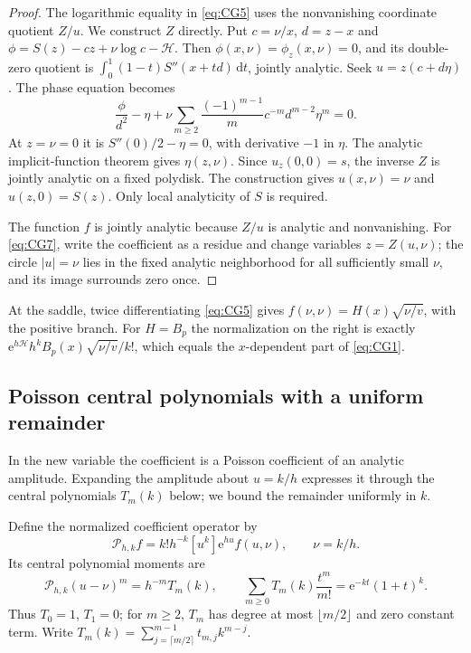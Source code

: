 \begin{proof}
The logarithmic equality in \eqref{eq:CG5} uses the nonvanishing
coordinate quotient \(Z/u\). We construct $Z$ directly. Put $c=\nu/x$, $d=z-x$ and
$\phi=S(z)-cz+\nu\log c-\mathcal H$.
Then $\phi(x,\nu)=\phi_z(x,\nu)=0$, and its double-zero quotient is
$\int_0^1(1-t)S''(x+td)\,\mathrm{d}t$, jointly analytic.
Seek $u=z(c+d\eta)$. The phase equation becomes
\begin{equation}
 \frac{\phi}{d^2}-\eta+
 \nu\sum_{m\ge2}\frac{(-1)^{m-1}}m c^{-m}d^{m-2}\eta^m=0.
 \label{eq:CG6}
\end{equation}
At $z=\nu=0$ it is $S''(0)/2-\eta=0$, with derivative $-1$ in
$\eta$. The analytic implicit-function theorem gives $\eta(z,\nu)$.
Since $u_z(0,0)=s$, the inverse $Z$ is jointly analytic on a fixed
polydisk. The construction gives $u(x,\nu)=\nu$ and $u(z,0)=S(z)$.
Only local analyticity of $S$ is required.

The function $f$ is jointly analytic because $Z/u$ is analytic and
nonvanishing. For \eqref{eq:CG7}, write the coefficient as a residue and
change variables $z=Z(u,\nu)$; the circle $|u|=\nu$ lies in the fixed
analytic neighborhood for all sufficiently small $\nu$, and its image
surrounds zero once.
\end{proof}

At the saddle,
twice differentiating \eqref{eq:CG5} gives
$f(\nu,\nu)=H(x)\sqrt{\nu/v}$, with the positive branch.
For $H=B_p$ the normalization on the right is exactly
$\mathrm{e}^{h\mathcal H}h^k B_p(x)\sqrt{\nu/v}/k!$,
which equals the $x$-dependent part of \eqref{eq:CG1}.

\subsection{Poisson central polynomials with a uniform remainder}

In the new variable the coefficient is a Poisson coefficient of an
analytic amplitude. Expanding the amplitude about $u=k/h$ expresses it
through the central polynomials $T_m(k)$ below; we bound the remainder
uniformly in $k$.

Define the normalized coefficient operator by
\[
 \mathscr P_{h,k}f=k!h^{-k}[u^k]\mathrm{e}^{hu}f(u,\nu),\qquad \nu=k/h.
\]
Its central polynomial moments are
\begin{equation}
 \mathscr P_{h,k}(u-\nu)^m=h^{-m}T_m(k),\qquad
 \sum_{m\ge0}T_m(k)\frac{t^m}{m!}=\mathrm{e}^{-kt}(1+t)^k.
 \label{eq:CG8}
\end{equation}
Thus $T_0=1$, $T_1=0$; for $m\ge2$, $T_m$ has degree at most
$\lfloor m/2\rfloor$ and zero constant term. Write
$T_m(k)=\sum_{j=\lceil m/2\rceil}^{m-1}t_{m,j}k^{m-j}$.

